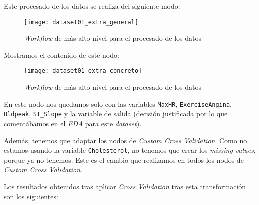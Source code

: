 \documentclass[11pt]{article}
\begin{document}
Este procesado de los datos se realiza del siguiente modo:

\begin{figure}[H]
    \centering
    \texttt{[image: dataset01\_extra\_general]}
    \caption{\emph{Workflow} de más alto nivel para el procesado de los datos}
\end{figure}

Mostramos el contenido de este nodo:

\begin{figure}[H]
    \centering
    \texttt{[image: dataset01\_extra\_concreto]}
    \caption{\emph{Workflow} de más alto nivel para el procesado de los datos}
\end{figure}

En este nodo nos quedamos solo con las variables \lstinline{MaxHR}, \lstinline{ExerciseAngina}, \lstinline{Oldpeak}, \lstinline{ST_Slope} y la variable de salida (decisión justificada por lo que comentábamos en el \emph{EDA} para este \emph{dataset}).

Además, tenemos que adaptar los nodos de \emph{Custom Cross Validation}. Como no estamos usando la variable \lstinline{Cholesterol}, no tenemos que crear los \emph{missing values}, porque ya no tenemos. Este es el cambio que realizamos en todos los nodos de \emph{Custom Cross Validation}.

Los resultados obtenidos tras aplicar \emph{Cross Validation} tras esta transformación son los siguientes:
\end{document}
